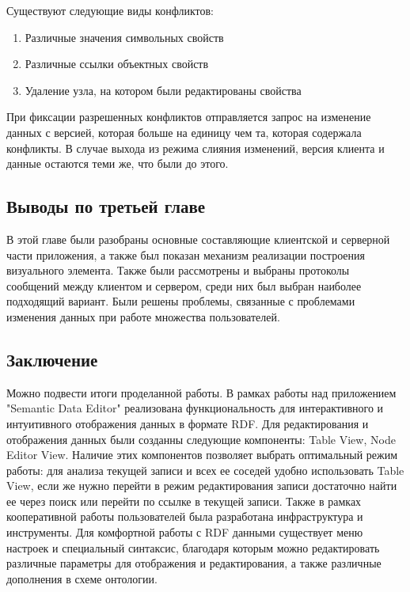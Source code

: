 \documentclass[12pt]{article}
\newcommand{\anonsection}[1]{\section*{#1}\addcontentsline{toc}{section}{#1}}
\begin{document}
Существуют следующие виды конфликтов:

\begin{enumerate}
    \item Различные значения символьных свойств
    \item Различные ссылки объектных свойств
    \item Удаление узла, на котором были редактированы свойства
\end{enumerate}

При фиксации разрешенных конфликтов отправляется запрос на изменение данных с версией, которая больше на единицу чем та, которая содержала конфликты. В случае выхода из режима слияния изменений, версия клиента и данные остаются теми же, что были до этого.

\subsection{Выводы по третьей главе}
\qquad В этой главе были разобраны основные составляющие клиентской и серверной части приложения, а также был показан механизм реализации построения визуального элемента. Также были рассмотрены и выбраны протоколы сообщений между клиентом и сервером, среди них был выбран наиболее подходящий вариант. Были решены проблемы, связанные с проблемами изменения данных при работе множества пользователей.

\pagebreak

\sectionfont{\centering}
\begin{center}
    {\anonsection{Заключение}}
\end{center}

Можно подвести итоги проделанной работы. В рамках работы над приложением "Semantic Data Editor" реализована функциональность для интерактивного и интуитивного отображения данных в формате RDF. Для редактирования и отображения данных были созданны следующие компоненты: Table View, Node Editor View. Наличие этих компонентов позволяет выбрать оптимальный режим работы: для анализа текущей записи и всех ее соседей удобно использовать Table View, если же нужно перейти в режим редактирования записи достаточно найти ее через поиск или перейти по ссылке в текущей записи. Также в рамках кооперативной работы пользователей была разработана инфраструктура и инструменты. Для комфортной работы с RDF данными существует меню настроек и специальный синтаксис, благодаря которым можно редактировать различные параметры для отображения и редактирования, а также различные дополнения в схеме онтологии.\par
\end{document}
